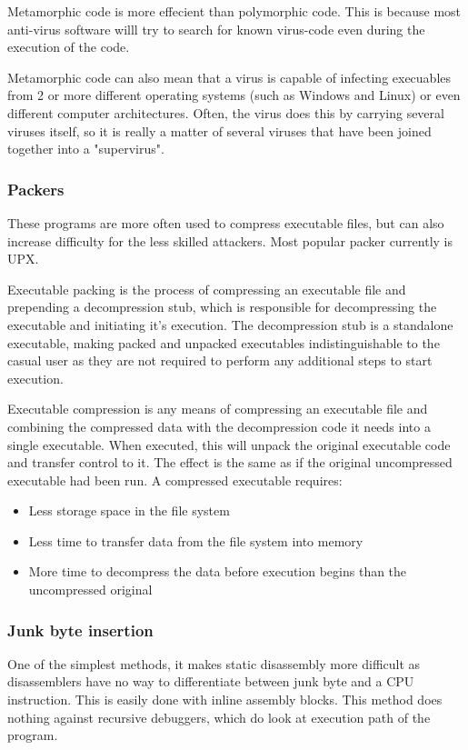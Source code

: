 \documentclass[a4paper,12pt]{article}
\begin{document}
    Metamorphic code is more effecient than polymorphic code. This is because
    most anti-virus software willl try to search for known virus-code even
    during the execution of the code.

    Metamorphic code can also mean that a virus is capable of infecting
    execuables from 2 or more different operating systems (such as Windows and
    Linux) or even different computer architectures. Often, the virus does
    this by carrying several viruses itself, so it is really a matter of
    several viruses that have been joined together into a "supervirus".

\subsubsection{Packers}
    These programs are more often used to compress
    executable files, but can also increase difficulty for the less skilled
    attackers. Most popular packer currently is UPX.

    Executable packing is the process of compressing an executable file and
    prepending a decompression stub, which is responsible for decompressing
    the executable and initiating it's execution. The decompression stub is a
    standalone executable, making packed and unpacked executables
    indistinguishable to the casual user as they are not required to perform
    any additional steps to start execution.

    Executable compression is any means of compressing an executable file and
    combining the compressed data with the decompression code it needs into a
    single executable. When executed, this will unpack the original executable
    code and transfer control to it. The effect is the same as if the original
    uncompressed executable had been run. A compressed executable requires:
    \begin{itemize}
    \item Less storage space in the file system
    \item Less time to transfer data from the file system into memory
    \item More time to decompress the data before execution begins than the
        uncompressed original
    \end{itemize}

\subsubsection{Junk byte insertion}
    One of the simplest methods, it makes static disassembly more
    difficult as disassemblers have no way to differentiate between junk
    byte and a CPU instruction. This is easily done with inline assembly
    blocks. This method does nothing against recursive debuggers, which
    do look at execution path of the program.
\end{document}
